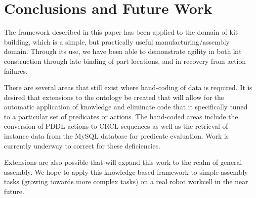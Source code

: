 \section{Conclusions and Future Work}
\label{sect:future}
The framework described in this paper has been applied to the domain of kit building, which is a simple, but practically useful manufacturing/assembly domain. Through its use, we have been able to demonstrate agility in both kit construction through late binding of part locations, and in recovery from action failures.

There are several areas that still exist where hand-coding of data is required. It is desired that extensions to the ontology be created that will allow for the automatic application of knowledge and eliminate code that it specifically tuned to a particular set of predicates or actions. The hand-coded areas include the conversion of PDDL actions to CRCL sequences as well as the retrieval of instance data from the MySQL database for predicate evaluation. Work is currently underway to correct for these deficiencies. 

Extensions are also possible that will expand this work to the realm of general assembly. We hope to apply this knowledge based framework to simple assembly tasks (growing towards more complex tasks) on a real robot workcell in the near future. 
